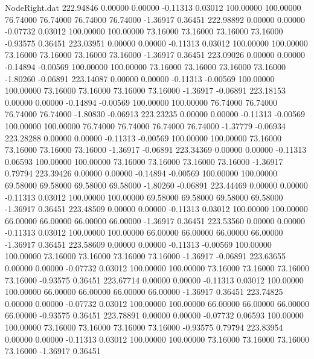\begin{filecontents}{NodeRight.dat}
 222.94846    0.00000    0.00000    -0.11313    0.03012  100.00000  100.00000   76.74000   76.74000   76.74000   76.74000   -1.36917    0.36451
 222.98892    0.00000    0.00000    -0.07732    0.03012  100.00000  100.00000   73.16000   73.16000   73.16000   73.16000   -0.93575    0.36451
 223.03951    0.00000    0.00000    -0.11313    0.03012  100.00000  100.00000   73.16000   73.16000   73.16000   73.16000   -1.36917    0.36451
 223.09026    0.00000    0.00000    -0.14894   -0.00569  100.00000  100.00000   73.16000   73.16000   73.16000   73.16000   -1.80260   -0.06891
 223.14087    0.00000    0.00000    -0.11313   -0.00569  100.00000  100.00000   73.16000   73.16000   73.16000   73.16000   -1.36917   -0.06891
 223.18153    0.00000    0.00000    -0.14894   -0.00569  100.00000  100.00000   76.74000   76.74000   76.74000   76.74000   -1.80830   -0.06913
 223.23235    0.00000    0.00000    -0.11313   -0.00569  100.00000  100.00000   76.74000   76.74000   76.74000   76.74000   -1.37779   -0.06934
 223.28288    0.00000    0.00000    -0.11313   -0.00569  100.00000  100.00000   73.16000   73.16000   73.16000   73.16000   -1.36917   -0.06891
 223.34369    0.00000    0.00000    -0.11313    0.06593  100.00000  100.00000   73.16000   73.16000   73.16000   73.16000   -1.36917    0.79794
 223.39426    0.00000    0.00000    -0.14894   -0.00569  100.00000  100.00000   69.58000   69.58000   69.58000   69.58000   -1.80260   -0.06891
 223.44469    0.00000    0.00000    -0.11313    0.03012  100.00000  100.00000   69.58000   69.58000   69.58000   69.58000   -1.36917    0.36451
 223.48509    0.00000    0.00000    -0.11313    0.03012  100.00000  100.00000   66.00000   66.00000   66.00000   66.00000   -1.36917    0.36451
 223.53560    0.00000    0.00000    -0.11313    0.03012  100.00000  100.00000   66.00000   66.00000   66.00000   66.00000   -1.36917    0.36451
 223.58609    0.00000    0.00000    -0.11313   -0.00569  100.00000  100.00000   73.16000   73.16000   73.16000   73.16000   -1.36917   -0.06891
 223.63655    0.00000    0.00000    -0.07732    0.03012  100.00000  100.00000   73.16000   73.16000   73.16000   73.16000   -0.93575    0.36451
 223.67714    0.00000    0.00000    -0.11313    0.03012  100.00000  100.00000   66.00000   66.00000   66.00000   66.00000   -1.36917    0.36451
 223.74825    0.00000    0.00000    -0.07732    0.03012  100.00000  100.00000   66.00000   66.00000   66.00000   66.00000   -0.93575    0.36451
 223.78891    0.00000    0.00000    -0.07732    0.06593  100.00000  100.00000   73.16000   73.16000   73.16000   73.16000   -0.93575    0.79794
 223.83954    0.00000    0.00000    -0.11313    0.03012  100.00000  100.00000   73.16000   73.16000   73.16000   73.16000   -1.36917    0.36451

\end{filecontents}
